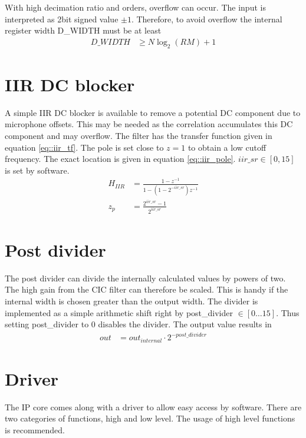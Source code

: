 With high decimation ratio and orders, overflow can occur.
The input is interpreted as 2bit signed value $\pm1$. 
Therefore, to avoid overflow the internal register width D\_WIDTH must be at least
\begin{align}
D\_WIDTH &\ge N\log_2{(RM)} + 1 \label{eq::cic_width}
\end{align}

\section{IIR DC blocker}
\label{sec::iir}
A simple IIR DC blocker is available to remove a potential DC component due to microphone offsets.
This may be needed as the correlation accumulates this DC component and may overflow.
The filter has the transfer function given in equation \ref{eq::iir_tf}.
The pole is set close to $z=1$ to obtain a low cutoff frequency.
The exact location is given in equation \ref{eq::iir_pole}.
$iir\_sr\in\left[0,15\right]$ is set by software.
\begin{align}
	H_{IIR} &= \frac{1-z^{-1}}{1-\left(1-2^{-iir\_sr}\right)z^{-1}} \label{eq::iir_tf}\\
	z_p &= \frac{2^{iir\_sr}-1}{2^{iir\_sr}} \label{eq::iir_pole}
\end{align}

\section{Post divider}
\label{sec::post_divider}

The post divider can divide the internally calculated values by powers of two.
The high gain from the CIC filter can therefore be scaled.
This is handy if the internal width is chosen greater than the output width.
The divider is implemented as a simple arithmetic shift right by post\_divider $\in\left[0\ldots15\right]$.
Thus setting post\_divider to 0 disables the divider.
The output value results in
\begin{align}
	out &= out_{internal}\cdot2^{-post\_divider}
\end{align}

\section{Driver}
\label{sec::driver}

The IP core comes along with a driver to allow easy access by software.
There are two categories of functions, high and low level.
The usage of high level functions is recommended.


